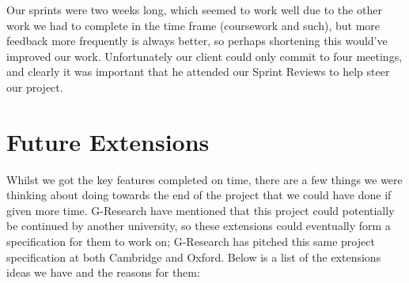 Our sprints were two weeks long, which seemed to work well due to the other work we had to complete in the time frame (coursework and such), but more feedback more frequently is always better, so perhaps shortening this would've improved our work. Unfortunately our client could only commit to four meetings, and clearly it was important that he attended our Sprint Reviews to help steer our project.

\section{Future Extensions}

Whilst we got the key features completed on time, there are a few things we were thinking about doing towards the end of the project that we could have done if given more time. G-Research have mentioned that this project could potentially be continued by another university, so these extensions could eventually form a specification for them to work on; G-Research has pitched this same project specification at both Cambridge and Oxford. Below is a list of the extensions ideas we have and the reasons for them:

